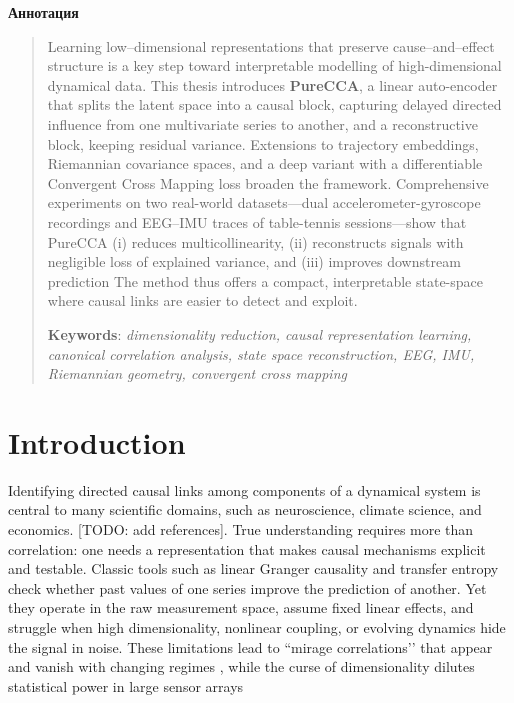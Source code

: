 \documentclass[14pt]{extarticle}
\begin{document}
	
	
	\newpage
	\tableofcontents
	\newpage
	
	\begin{center}
		\Large{\textbf{Аннотация}}
	\end{center}
	
	\begin{abstract}
		Learning low–dimensional representations that preserve cause–and–effect structure is a key step toward interpretable modelling of high-dimensional dynamical data.
		This thesis introduces \textbf{PureCCA}, a linear auto-encoder that splits the latent space into a causal block, capturing delayed directed influence from one multivariate series to another, and a reconstructive block, keeping residual variance.  
		Extensions to trajectory embeddings, Riemannian covariance spaces, and a deep variant with a differentiable Convergent Cross Mapping loss broaden the framework.  
		Comprehensive experiments on two real-world datasets—dual accelerometer-gyroscope recordings and EEG–IMU traces of table-tennis sessions—show that PureCCA  
		(i) reduces multicollinearity,  
		(ii) reconstructs signals with negligible loss of explained variance, and  
		(iii) improves downstream prediction
		The method thus offers a compact, interpretable state-space where causal links are easier to detect and exploit.
		
		\bigskip
		\textbf{Keywords}: \emph{dimensionality reduction, causal representation learning, canonical correlation analysis, state space reconstruction, EEG, IMU, Riemannian geometry, convergent cross mapping}
	\end{abstract}
	
	\newpage
	
	\section{Introduction}
	
	Identifying directed causal links among components of a dynamical system is central to many scientific domains, such as neuroscience, climate science, and economics. [TODO: add references].
	True understanding requires more than correlation: one needs a representation that makes causal mechanisms explicit and testable.  
	Classic tools such as linear Granger causality \citep{Granger1969} and transfer entropy \citep{Schreiber2000} check whether past values of one series improve the prediction of another.  
	Yet they operate in the raw measurement space, assume fixed linear effects, and struggle when high dimensionality, nonlinear coupling, or evolving dynamics hide the signal in noise.  
	These limitations lead to ``mirage correlations’’ that appear and vanish with changing regimes \citep{Sugihara2012}, while the curse of dimensionality dilutes statistical power in large sensor arrays \citep{Runge2019}
	   
\end{document}
